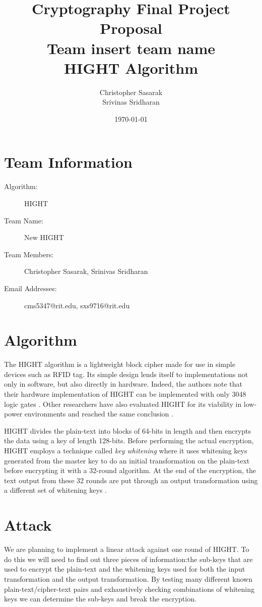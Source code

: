 \documentclass[letterpaper,notitlepage]{article}
\title{Cryptography Final Project Proposal\\Team insert team name\\ HIGHT Algorithm}
\author{Christopher Sasarak\\ Srivinas Sridharan}
\date{\today}
\begin{document}
\maketitle
\thispagestyle{empty}

\section*{Team Information}
\begin{description}
    \item[Algorithm:] HIGHT
    \item[Team Name:] New HIGHT
    \item[Team Members:] Christopher Sasarak, Srinivas Sridharan   
    \item[Email Addresses:] cms5347@rit.edu, sxs9716@rit.edu
\end{description}

\section*{Algorithm}
The HIGHT algorithm\cite{hight} is a lightweight block cipher made for use in simple devices
such as RFID tag. Its simple design lends itself to implementations
not only in software, but also directly in hardware. Indeed, the authors note 
that their hardware implementation of HIGHT can be implemented with only 3048 logic
gates \cite{hight}. Other researchers have also evaluated HIGHT for its viability
in low-power environments and reached the same conclusion 
\cite{hight_implementation}.

HIGHT divides the plain-text into blocks of 64-bits in length and then encrypts
the data using a key of length 128-bits. Before performing the actual encryption, 
HIGHT employs a technique called \emph{key whitening} where it uses whitening
keys generated from the master key to do an initial transformation on the 
plain-text before encrypting it with a 32-round algorithm. At the end of the
encryption, the text output from these 32 rounds are put through an output
transformation using a different set of whitening keys \cite{hight}.

\section*{Attack}
We are planning to implement a linear attack against one round of HIGHT.
To do this we will need to find out three pieces of information:the sub-keys that 
are used to encrypt the plain-text and the whitening keys used for both the
input transformation and the output transformation. By testing many different 
known plain-text/cipher-text pairs and exhaustively checking combinations of 
whitening keys we can determine the sub-keys and break the encryption.




\end{document}
